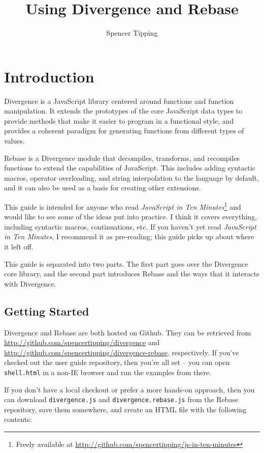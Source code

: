 \documentclass{report}
\title{Using Divergence and Rebase}
\author{Spencer Tipping}
\begin{document}
\maketitle\tableofcontents

\chapter* {Introduction}
   Divergence is a JavaScript library centered around functions and function manipulation. It extends the prototypes of the core JavaScript data types to provide methods that make it easier to
   program in a functional style, and provides a coherent paradigm for generating functions from different types of values.

   Rebase is a Divergence module that decompiles, transforms, and recompiles functions to extend the capabilities of JavaScript. This includes adding syntactic macros, operator overloading, and
   string interpolation to the language by default, and it can also be used as a basis for creating other extensions.

   This guide is intended for anyone who read {\em JavaScript in Ten Minutes}\footnote{Freely available at \url{http://github.com/spencertipping/js-in-ten-minutes}} and would like to see some
   of the ideas put into practice. I think it covers everything, including syntactic macros, continuations, etc. If you haven't yet read {\em JavaScript in Ten Minutes}, I recommend it as
   pre-reading; this guide picks up about where it left off.

   This guide is separated into two parts. The first part goes over the Divergence core library, and the second part introduces Rebase and the ways that it interacts with Divergence.

\section* {Getting Started}
     Divergence and Rebase are both hosted on Github. They can be retrieved from \url{http://github.com/spencertipping/divergence} and \url{http://github.com/spencertipping/divergence-rebase},
     respectively. If you've checked out the user guide repository, then you're all set -- you can open \verb|shell.html| in a non-IE browser and run the examples from there.
    
     If you don't have a local checkout or prefer a more hands-on approach, then you can download \verb|divergence.js| and \verb|divergence.rebase.js| from the Rebase repository, save them
     somewhere, and create an HTML file with the following contents:
\end{document}
